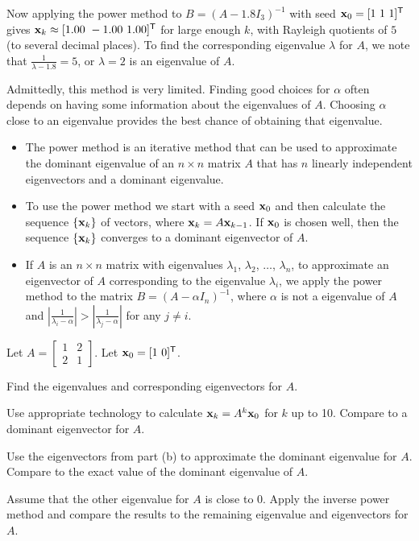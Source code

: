 \begin{example}
Now applying the power method to $B = (A-1.8I_3)^{-1}$ with seed $\mathbf{x}_0 = [1 \ 1 \ 1]^{\mathsf{T}}$ gives $\vx_k \approx [ 1.00 \ -1.00 \ 1.00]^{\tr}$ for large enough $k$, with Rayleigh quotients of $5$ (to several decimal places). To find the corresponding eigenvalue $\lambda$ for $A$, we note that $\frac{1}{\lambda-1.8} = 5$, or  $\lambda = 2$ is an eigenvalue of $A$.  

Admittedly, this method is very limited. Finding good choices for $\alpha$ often depends on having some information about the eigenvalues of $A$. Choosing $\alpha$ close to an eigenvalue provides the best chance of obtaining that eigenvalue.   

\ea

\end{example}


\begin{itemize}
\item The power method is an iterative method that can be used to approximate the dominant eigenvalue of an $n \times n$ matrix $A$ that has $n$ linearly independent eigenvectors and a dominant eigenvalue. 
\item To use the power method we start with a seed $\mathbf{x}_0$ and then calculate the sequence $\{\mathbf{x}_k\}$ of vectors, where $\mathbf{x}_k = A \mathbf{x}_{k-1}$. If $\mathbf{x}_0$ is chosen well, then the sequence $\{\mathbf{x}_k\}$ converges to a dominant eigenvector of $A$. 
\item If $A$ is an $n \times n$ matrix with eigenvalues $\lambda_1$, $\lambda_2$, $\ldots$, $\lambda_n$, to approximate an eigenvector of $A$ corresponding to the eigenvalue $\lambda_i$, we apply the power method to the matrix $B = (A - \alpha I_n)^{-1}$, where $\alpha$ is not a eigenvalue of $A$ and $\left| \frac{1}{\lambda_i - \alpha} \right| > \left| \frac{1}{\lambda_j - \alpha} \right|$ for any $j \neq i$. 
\end{itemize}


\be
\item Let $A = \left[ \begin{array}{cc} 1&2\\2&1 \end{array} \right]$. Let $\mathbf{x}_0 = [1 \ 0]^{\mathsf{T}}$. 
	\ba
	\item Find the eigenvalues and corresponding eigenvectors for $A$. 
	\item Use appropriate technology to calculate $\mathbf{x}_k = A^k \mathbf{x}_0$ for $k$ up to 10. Compare to a dominant eigenvector for $A$. 
	\item Use the eigenvectors from part (b) to approximate the dominant eigenvalue for $A$. Compare to the exact value of the dominant eigenvalue of $A$. 
	\item Assume that the other eigenvalue for $A$ is close to $0$. Apply the inverse power method and compare the results to the remaining eigenvalue and eigenvectors for $A$.
	\ea

